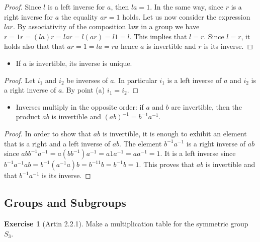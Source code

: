 \documentclass[
]{book}
\providecommand{\tightlist}{%
  \setlength{\itemsep}{0pt}\setlength{\parskip}{0pt}}
\theoremstyle{definition}
\theoremstyle{definition}
\theoremstyle{definition}
\newtheorem{exercise}{Exercise}[chapter]
\theoremstyle{definition}
\theoremstyle{remark}
\begin{document}
\begin{proof}
Since \(l\) is a left inverse for \(a\), then \(la = 1\). In the same way, since \(r\) is a right inverse for \(a\) the equality \(ar = 1\) holds. Let us now consider the expression \(lar\). By associativity of the composition law in a group we have \(r = 1r = (la)r = lar = l(ar) = l1 = l\). This implies that \(l = r\). Since \(l = r\), it holds also that that \(ar = 1 = la = ra\) hence \(a\) is invertible and \(r\) is its inverse.
\end{proof}

\begin{itemize}
\tightlist
\item
  If \(a\) is invertible, its inverse is unique.
\end{itemize}

\begin{proof}
Let \(i_1\) and \(i_2\) be inverses of \(a\). In particular \(i_1\) is a left inverse of \(a\) and \(i_2\) is a right inverse of \(a\). By point (a) \(i_1 = i_2\).
\end{proof}

\begin{itemize}
\tightlist
\item
  Inverses multiply in the opposite order: if \(a\) and \(b\) are invertible, then the product \(ab\) is invertible and \((ab)^{-1} = b^{-1}a^{-1}\).
\end{itemize}

\begin{proof}
In order to show that \(ab\) is invertible, it is enough to exhibit an element that is a right and a left inverse of \(ab\). The element \(b^{-1}a^{-1}\) is a right inverse of \(ab\) since \(abb^{-1}a^{-1} = a(bb^{-1})a^{-1} = a1a^{-1} = aa^{-1} = 1\). It is a left inverse since \(b^{-1}a^{-1}ab = b^{-1}(a^{-1}a)b = b^{-11}b = b^{-1}b = 1\). This proves that \(ab\) is invertible and that \(b^{-1}a^{-1}\) is its inverse.
\end{proof}

\hypertarget{groups-and-subgroups-1}{%
\subsection{Groups and Subgroups}\label{groups-and-subgroups-1}}

\begin{exercise}[Artin 2.2.1]
\protect\hypertarget{exr:unnamed-chunk-69}{}\label{exr:unnamed-chunk-69}Make a multiplication table for the symmetric group \(S_3\).
\end{exercise}
\end{document}

